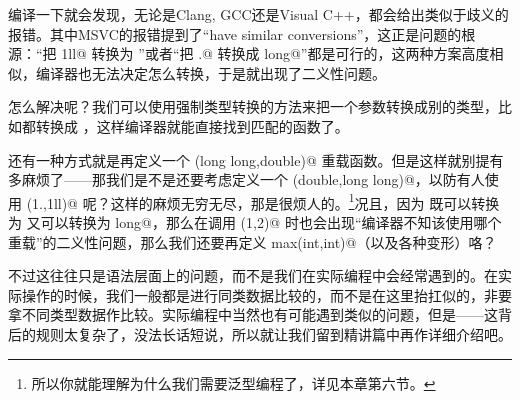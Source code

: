 编译一下就会发现，无论是Clang, GCC还是Visual C++，都会给出类似于歧义的报错。其中MSVC的报错提到了``have similar conversions''，这正是问题的根源：``把 \lstinline@1ll@ 转换为 \lstinline@double@''或者``把 .@ 转换成 \lstinline@long long@''都是可行的，这两种方案高度相似，编译器也无法决定怎么转换，于是就出现了二义性问题。\par
怎么解决呢？我们可以使用强制类型转换的方法来把一个参数转换成别的类型，比如都转换成 \lstinline@double@，这样编译器就能直接找到匹配的函数了。\par
还有一种方式就是再定义一个 \lstinline@fun(long long,double)@ 重载函数。但是这样就别提有多麻烦了——那我们是不是还要考虑定义一个 \lstinline@fun(double,long long)@，以防有人使用 \lstinline@fun(1.,1ll)@ 呢？这样的麻烦无穷无尽，那是很烦人的。\footnote{所以你就能理解为什么我们需要泛型编程了，详见本章第六节。}况且，因为 \lstinline@int@ 既可以转换为 \lstinline@double@ 又可以转换为 \lstinline@long long@，那么在调用 \lstinline@max(1,2)@ 时也会出现``编译器不知该使用哪个重载''的二义性问题，那么我们还要再定义 \lstinline@int max(int,int)@（以及各种变形）咯？\par
不过这往往只是语法层面上的问题，而不是我们在实际编程中会经常遇到的。在实际操作的时候，我们一般都是进行同类数据比较的，而不是在这里抬扛似的，非要拿不同类型数据作比较。实际编程中当然也有可能遇到类似的问题，但是——这背后的规则太复杂了，没法长话短说，所以就让我们留到精讲篇中再作详细介绍吧。\par
\pagebreak
